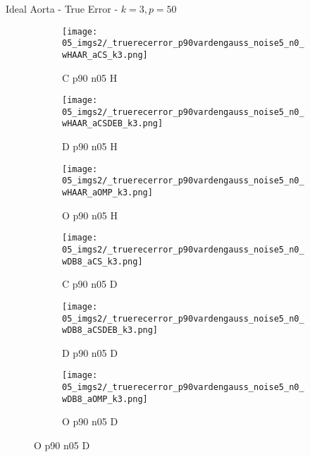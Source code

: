 \begin{frame}{Ideal Aorta - True Error - $k=3,p=50$}{}
\begin{figure}
\begin{subfigure}{0.13\textwidth}
\texttt{[image: 05\_imgs2/\_truerecerror\_p90vardengauss\_noise5\_n0\_wHAAR\_aCS\_k3.png]}
\caption*{\tiny C p90 n05 H}
\end{subfigure}
\begin{subfigure}{0.13\textwidth}
\texttt{[image: 05\_imgs2/\_truerecerror\_p90vardengauss\_noise5\_n0\_wHAAR\_aCSDEB\_k3.png]}
\caption*{\tiny D p90 n05 H}
\end{subfigure}
\begin{subfigure}{0.13\textwidth}
\texttt{[image: 05\_imgs2/\_truerecerror\_p90vardengauss\_noise5\_n0\_wHAAR\_aOMP\_k3.png]}
\caption*{\tiny O p90 n05 H}
\end{subfigure}
\begin{subfigure}{0.13\textwidth}
\texttt{[image: 05\_imgs2/\_truerecerror\_p90vardengauss\_noise5\_n0\_wDB8\_aCS\_k3.png]}
\caption*{\tiny C p90 n05 D}
\end{subfigure}
\begin{subfigure}{0.13\textwidth}
\texttt{[image: 05\_imgs2/\_truerecerror\_p90vardengauss\_noise5\_n0\_wDB8\_aCSDEB\_k3.png]}
\caption*{\tiny D p90 n05 D}
\end{subfigure}
\begin{subfigure}{0.13\textwidth}
\texttt{[image: 05\_imgs2/\_truerecerror\_p90vardengauss\_noise5\_n0\_wDB8\_aOMP\_k3.png]}
\caption*{\tiny O p90 n05 D}
\end{subfigure}

\vspace{5pt}


\end{figure}
\end{frame}
